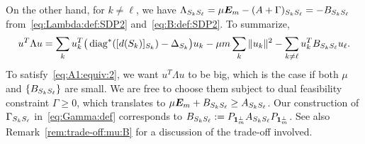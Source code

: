   On the other hand, for $k \neq \ell$, we have $\Lambda_{S_{k}S_{\ell}} = \mu \bm{E}_m - (A+\Gamma)_{S_{k}S_{\ell}} = - B_{S_{k} S_{\ell}}$ from~\eqref{eq:Lambda:def:SDP2} and~\eqref{eq:B:def:SDP2}. To summarize, 
  \begin{align}\label{eq:u:Lambda:u:SDP2}
    u^T \Lambda u = \sum_k u_k^T\big( \operatorname{diag}^*([d(S_{k})]_{S_{k}}) - \Delta_{S_{k}} \big) u_k 
    - \mu m \sum_{k} \|u_k\|^2 - \sum_{k \neq \ell} u_k^T B_{S_{k} S_{\ell}} u_\ell.
  \end{align}
  To satisfy~\eqref{eq:A1:equiv:2}, we want $u^T \Lambda u$ to be big, which is the case if both $\mu$ and $\{B_{S_{k} S_{\ell}}\}$ are small. We are free to choose them subject to dual feasibility constraint $\Gamma \ge 0$, which translates to
  $\mu \bm{E}_m + B_{S_{k}S_{\ell}} \ge A_{S_{k}S_{\ell}}$. Our construction of $\Gamma_{S_{k}S_{\ell}}$ in~\eqref{eq:Gamma:def} corresponds to $B_{S_{k}S_{\ell}} := P_{\bm{1}_m^\perp} A_{S_{k}S_{\ell}} P_{\bm{1}_m^\perp} $. See also Remark~\ref{rem:trade-off:mu:B} for a discussion of the trade-off involved.

